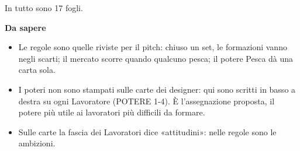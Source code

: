 \documentclass[10pt]{article}
\begin{document}
\begin{minipage}[t]{174mm}
\vspace{2mm}
In tutto sono 17 fogli.

\vspace{2mm}
{\fontsize{13}{16}\selectfont\bfseries Da sapere\par}
\begin{itemize}
  \item Le regole sono quelle riviste per il pitch: chiuso un set, le formazioni vanno negli scarti; il mercato scorre quando qualcuno pesca; il potere Pesca dà una carta sola.
  \item I poteri non sono stampati sulle carte dei designer: qui sono scritti in basso a destra su ogni Lavoratore (POTERE 1-4). È l'assegnazione proposta, il potere più utile ai lavoratori più difficili da formare.
  \item Sulle carte la fascia dei Lavoratori dice «attitudini»: nelle regole sono le ambizioni.
\end{itemize}
\end{minipage}
\newpage
\end{document}

